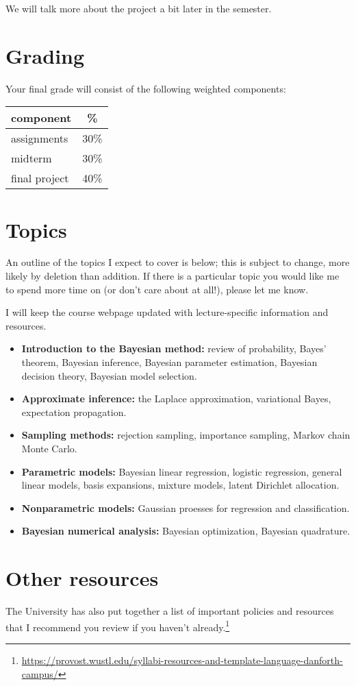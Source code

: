 \documentclass{article}
\begin{document}
We will talk more about the project a bit later in the semester.

\section*{Grading}

Your final grade will consist of the following weighted components:
\begin{center}
  \begin{tabular}{lc}
    \toprule
    component                    &   \% \\
    \midrule
    assignments                  & 30\% \\
    midterm                      & 30\% \\
    final project                & 40\% \\
    \bottomrule
  \end{tabular}
\end{center}

\section*{Topics}

An outline of the topics I expect to cover is below; this is subject to change,
more likely by deletion than addition.  If there is a particular topic you would
like me to spend more time on (or don't care about at all!), please let me know.

I will keep the course webpage updated with lecture-specific information and
resources.

\begin{itemize}
\item \textbf{Introduction to the Bayesian method:} review of probability,
  Bayes' theorem, Bayesian inference, Bayesian parameter estimation, Bayesian
  decision theory, Bayesian model selection.
\item \textbf{Approximate inference:} the Laplace approximation, variational
  Bayes, expectation propagation.
\item \textbf{Sampling methods:} rejection sampling, importance sampling, Markov
  chain Monte Carlo.
\item \textbf{Parametric models:} Bayesian linear regression, logistic
  regression, general linear models, basis expansions, mixture models, latent
  Dirichlet allocation.
\item \textbf{Nonparametric models:} Gaussian proesses for regression and
  classification.
\item \textbf{Bayesian numerical analysis:} Bayesian optimization, Bayesian
  quadrature.
\end{itemize}

\section*{Other resources}

The University has also put together a list of important policies and resources
that I recommend you review if you haven't already.\footnote{\url{https://provost.wustl.edu/syllabi-resources-and-template-language-danforth-campus/}}
\end{document}
